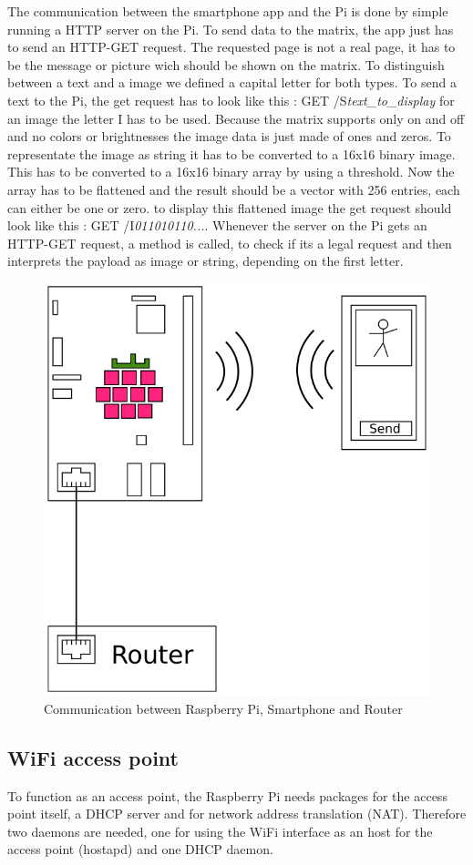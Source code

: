 \documentclass[conference]{IEEEtran}
\begin{document}
The communication between the smartphone app and the Pi is done by simple running a HTTP server on the Pi. To send data to the matrix, the app just has to send an HTTP-GET request. The requested page is not a real page, it has to be the message or picture wich should be shown on the matrix. To distinguish between a text and a image we defined a capital letter for both types. To send a text to the Pi, the get request has to look like this : GET /S\textit{text\_to\_display} for an image the letter I has to be used. Because the matrix supports only on and off and no colors or brightnesses the image data is just made of ones and zeros. To representate the image as string it has to be converted to a 16x16 binary image. This has to be converted to a 16x16 binary array by using a threshold. Now the array has to be flattened and the result should be a vector with 256 entries, each can either be one or zero. to display this flattened image the get request should look like this : GET /I\textit{011010110...}. Whenever the server on the Pi gets an HTTP-GET request, a method is called, to check if its a legal request and then interprets the payload as image or string, depending on the first letter.

\begin{figure}[ht]
\centering
\includegraphics[width=0.75\linewidth]{pics/RasPi-MC}
\caption{Communication between Raspberry Pi, Smartphone and Router}
\label{FIG:COMMUNICATION}
\end{figure}

\subsection{WiFi access point}
To function as an access point, the Raspberry Pi needs packages for the access point itself, a DHCP server and for network address translation (NAT). Therefore two daemons are needed, one for using the WiFi interface as an host for the access point (hostapd) and one DHCP daemon.
\end{document}
